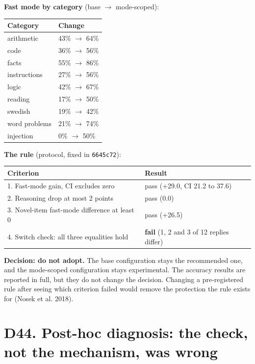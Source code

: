 \documentclass[11pt,a4paper]{article}
\newcommand{\code}[1]{\texttt{#1}}
\begin{document}
\textbf{Fast mode by category} (base $\rightarrow$ mode-scoped):

\begin{table}[H]\centering\small
\begin{tabularx}{\textwidth}{@{}lY@{}}
\toprule
Category & Change \\
\midrule
arithmetic & 43\% $\rightarrow$ 64\% \\
code & 36\% $\rightarrow$ 56\% \\
facts & 55\% $\rightarrow$ 86\% \\
instructions & 27\% $\rightarrow$ 56\% \\
logic & 42\% $\rightarrow$ 67\% \\
reading & 17\% $\rightarrow$ 50\% \\
swedish & 19\% $\rightarrow$ 42\% \\
word problems & 21\% $\rightarrow$ 74\% \\
injection & 0\% $\rightarrow$ 50\% \\
\bottomrule\end{tabularx}\end{table}

\textbf{The rule} (protocol, fixed in \code{6645c72}):

\begin{table}[H]\centering\small
\begin{tabularx}{\textwidth}{@{}lY@{}}
\toprule
Criterion & Result \\
. Fast-mode gain, CI excludes zero & pass (+29.0, CI 21.2 to 37.6) \\
2. Reasoning drop at most 2 points & pass (0.0) \\
3. Novel-item fast-mode difference at least 0 & pass (+26.5) \\
4. Switch check: all three equalities hold & \textbf{fail} (1, 2 and 3 of 12 replies differ) \\
\bottomrule\end{tabularx}\end{table}

\textbf{Decision: do not adopt.} The base configuration stays the recommended one, and the mode-scoped configuration stays experimental. The accuracy results are reported in full, but they do not change the decision. Changing a pre-registered rule after seeing which criterion failed would remove the protection the rule exists for (Nosek et al. 2018).

\section{D44. Post-hoc diagnosis: the check, not the mechanism, was wrong}
\end{document}
